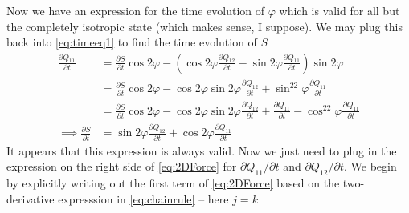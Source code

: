 \documentclass[reqno]{article}
\begin{document}
	Now we have an expression for the time evolution of $\varphi$ which is valid for all but the completely isotropic state (which makes sense, I suppose). We may plug this back into \eqref{eq:timeeq1} to find the time evolution of $S$
	\begin{equation}
	\begin{split}
		\frac{\partial Q_{11}}{\partial t} &= \frac{\partial S}{\partial t} \cos2\varphi - \left( \cos2\varphi \frac{\partial Q_{12}}{\partial t} - \sin2\varphi \frac{\partial Q_{11}}{\partial t} \right)\sin2\varphi \\
		&= \frac{\partial S}{\partial t}\cos2\varphi - \cos2\varphi\sin2\varphi \frac{\partial Q_{12}}{\partial t} + \sin^22\varphi \frac{\partial Q_{11}}{\partial t} \\
		&= \frac{\partial S}{\partial t}\cos2\varphi - \cos2\varphi\sin2\varphi \frac{\partial Q_{12}}{\partial t} +  \frac{\partial Q_{11}}{\partial t} - \cos^22\varphi \frac{\partial Q_{11}}{\partial t}\\
		\implies \frac{\partial S}{\partial t} &= \sin2\varphi \frac{\partial Q_{12}}{\partial t} + \cos2\varphi \frac{\partial Q_{11}}{\partial t}
	\end{split}
	\end{equation}
	It appears that this expression is always valid. Now we just need to plug in the expression on the right side of \eqref{eq:2DForce} for $\partial Q_{11}/\partial t$ and $\partial Q_{12}/\partial t$. We begin by explicitly writing out the first term of \eqref{eq:2DForce} based on the two-derivative expresssion in \eqref{eq:chainrule} -- here $j = k$
\end{document}
